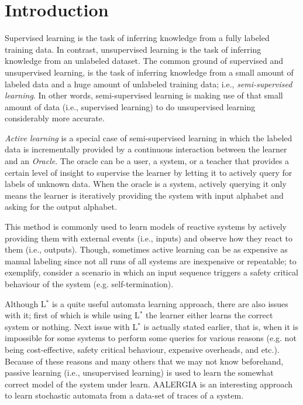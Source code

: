 \documentclass[
a4paper,     %
12pt         %
]{scrartcl}  %
\newcommand\me[1]{ [* {\textbf ME:} #1 *]}
\begin{document}
\section{Introduction}
Supervised learning is the task of inferring knowledge from a fully labeled training data. In contrast, unsupervised learning is the task of inferring knowledge from an unlabeled dataset. The common ground of supervised and unsupervised learning, is the task of inferring knowledge from a small amount of labeled data and a huge amount of unlabeled training data; i.e., \emph{semi-supervised learning}. In other words, semi-supervised learning is making use of that small amount of data (i.e., supervised learning) to do unsupervised learning considerably more accurate.
\par \emph{Active learning} is a special case of semi-supervised learning in which the labeled data is incrementally provided by a continuous interaction between the learner and an \emph{Oracle}. The oracle can be a user, a system, or a teacher that provides a certain level of insight to supervise the learner by letting it to actively query for labels of unknown data. When the oracle is a system, actively querying it only means the learner is iteratively providing the system with input alphabet and asking for the output alphabet.
\par This method is commonly used to learn models of reactive systems by actively providing them with external events (i.e., inputs) and observe how they react to them (i.e., outputs). Though, sometimes active learning can be as expensive as manual labeling since not all runs of all systems are inexpensive or repeatable; to exemplify, consider a scenario in which an input sequence triggers a safety critical behaviour of the system (e.g. self-termination).
\par \me{here goes a brief history about the L$^*$ algorithm of Angluin (2 or 3 paragraphs).}
\par Although L$^*$ is a quite useful automata learning approach, there are also issues with it; first of which is while using L$^*$ the learner either learns the correct system or nothing. Next issue with L$^*$ is actually stated earlier, that is, when it is impossible for some systems to perform some queries for various reasons (e.g. not being cost-effective, safety critical behaviour, expensive overheads, and etc.). Because of these reasons and many others that we may not know beforehand, passive learning (i.e., unsupervised learning) is used to learn the somewhat correct model of the system under learn. AALERGIA\cite{Mao.} is an interesting approach to learn stochastic automata from a data-set of traces of a system.
\par \me{here you have to reword parts of introduction of AALERGIA \cite{Mao.} that are relate to the incentives of devising such method; two or three paragraphs suffice.}
\end{document}
